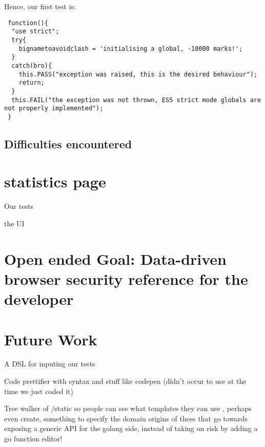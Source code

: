 Hence, our first test is:

\begin{verbatim}
 function(){
  "use strict";
  try{
    bignametoavoidclash = 'initialising a global, -10000 marks!';
  }
  catch(bro){
    this.PASS("exception was raised, this is the desired behaviour");
    return;
  }
  this.FAIL("the exception was not thrown, ES5 strict mode globals are not properly implemented");
 }
\end{verbatim}



\subsection{Difficulties encountered}

\section{statistics page}

Our tests 

the UI 


\section{Open ended Goal: Data-driven browser security reference for the developer }

\section{Future Work}

A DSL for inputing our tests

Code prettifier with syntax and stuff like codepen (didn't occur to use at the time we just coded it)

Tree walker of /static so people can see what templates they can use , perhaps even create, something to specify the domain origins of these that go towards exposing a generic API for the golang side, instead of taking on risk by adding a go function editor!

